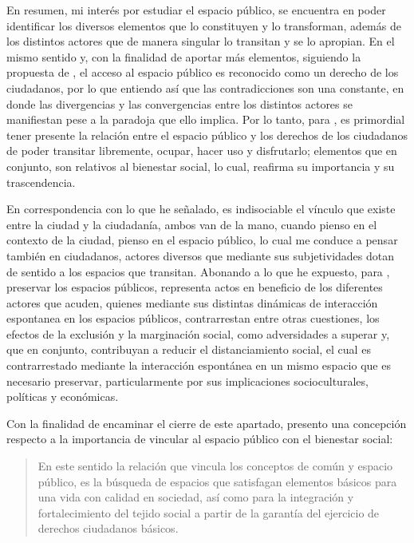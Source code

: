 \documentclass[
  spanish,
  11pt,
  a4paper,
]{scrbook}
\begin{document}
En resumen, mi interés por estudiar el espacio público, se encuentra en
poder identificar los diversos elementos que lo constituyen y lo
transforman, además de los distintos actores que de manera singular lo
transitan y se lo apropian. En el mismo sentido y, con la finalidad de
aportar más elementos, siguiendo la propuesta de \textcite{Carrion2019},
el acceso al espacio público es reconocido como un derecho de los
ciudadanos, por lo que entiendo así que las contradicciones son una
constante, en donde las divergencias y las convergencias entre los
distintos actores se manifiestan pese a la paradoja que ello implica.
Por lo tanto, para \textcite{Borja2019}, es primordial tener presente la
relación entre el espacio público y los derechos de los ciudadanos de
poder transitar libremente, ocupar, hacer uso y disfrutarlo; elementos
que en conjunto, son relativos al bienestar social, lo cual, reafirma su
importancia y su trascendencia.

En correspondencia con lo que he señalado, es indisociable el vínculo
que existe entre la ciudad y la ciudadanía, ambos van de la mano, cuando
pienso en el contexto de la ciudad, pienso en el espacio público, lo
cual me conduce a pensar también en ciudadanos, actores diversos que
mediante sus subjetividades dotan de sentido a los espacios que
transitan. Abonando a lo que he expuesto, para \textcite{Borja2012},
preservar los espacios públicos, representa actos en beneficio de los
diferentes actores que acuden, quienes mediante sus distintas dinámicas
de interacción espontanea en los espacios públicos, contrarrestan entre
otras cuestiones, los efectos de la exclusión y la marginación social,
como adversidades a superar y, que en conjunto, contribuyan a reducir el
distanciamiento social, el cual es contrarrestado mediante la
interacción espontánea en un mismo espacio que es necesario preservar,
particularmente por sus implicaciones socioculturales, políticas y
económicas.

Con la finalidad de encaminar el cierre de este apartado, presento una
concepción respecto a la importancia de vincular al espacio público con
el bienestar social:

\begin{quote}
En este sentido la relación que vincula los conceptos de común y espacio
público, es la búsqueda de espacios que satisfagan elementos básicos
para una vida con calidad en sociedad, así como para la integración y
fortalecimiento del tejido social a partir de la garantía del ejercicio
de derechos ciudadanos básicos. \autocite[168]{Campos2015}
\end{quote}
\end{document}
